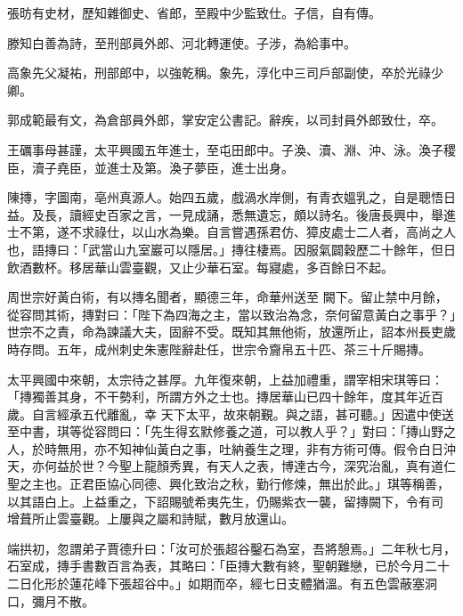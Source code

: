 \begin{pinyinscope}
 張昉有史材，歷知雜御史、省郎，至殿中少監致仕。子信，自有傳。



 滕知白善為詩，至刑部員外郎、河北轉運使。子涉，為給事中。



 高象先父凝祐，刑部郎中，以強乾稱。象先，淳化中三司戶部副使，卒於光祿少卿。



 郭成範最有文，為倉部員外郎，掌安定公書記。辭疾，以司封員外郎致仕，卒。



 王礪事母甚謹，太平興國五年進士，至屯田郎中。子渙、瀆、淵、沖、泳。渙子稷臣，瀆子堯臣，並進士及第。渙子夢臣，進士出身。



 陳摶，字圖南，亳州真源人。始四五歲，戲渦水岸側，有青衣媼乳之，自是聰悟日益。及長，讀經史百家之言，一見成誦，悉無遺忘，頗以詩名。後唐長興中，舉進士不第，遂不求祿仕，以山水為樂。自言嘗遇孫君仿、獐皮處士二人者，高尚之人也，語摶曰：「武當山九室巖可以隱居。」摶往棲焉。因服氣闢穀歷二十餘年，但日飲酒數杯。移居華山雲臺觀，又止少華石室。每寢處，多百餘日不起。



 周世宗好黃白術，有以摶名聞者，顯德三年，命華州送至
 闕下。留止禁中月餘，從容問其術，摶對曰：「陛下為四海之主，當以致治為念，奈何留意黃白之事乎？」世宗不之責，命為諫議大夫，固辭不受。既知其無他術，放還所止，詔本州長吏歲時存問。五年，成州刺史朱憲陛辭赴任，世宗令齎帛五十匹、茶三十斤賜摶。



 太平興國中來朝，太宗待之甚厚。九年復來朝，上益加禮重，謂宰相宋琪等曰：「摶獨善其身，不干勢利，所謂方外之士也。摶居華山已四十餘年，度其年近百歲。自言經承五代離亂，幸
 天下太平，故來朝覲。與之語，甚可聽。」因遣中使送至中書，琪等從容問曰：「先生得玄默修養之道，可以教人乎？」對曰：「摶山野之人，於時無用，亦不知神仙黃白之事，吐納養生之理，非有方術可傳。假令白日沖天，亦何益於世？今聖上龍顏秀異，有天人之表，博達古今，深究治亂，真有道仁聖之主也。正君臣協心同德、興化致治之秋，勤行修煉，無出於此。」琪等稱善，以其語白上。上益重之，下詔賜號希夷先生，仍賜紫衣一襲，留摶闕下，令有司
 增葺所止雲臺觀。上屢與之屬和詩賦，數月放還山。



 端拱初，忽謂弟子賈德升曰：「汝可於張超谷鑿石為室，吾將憩焉。」二年秋七月，石室成，摶手書數百言為表，其略曰：「臣摶大數有終，聖朝難戀，已於今月二十二日化形於蓮花峰下張超谷中。」如期而卒，經七日支體猶溫。有五色雲蔽塞洞口，彌月不散。




\end{pinyinscope}
